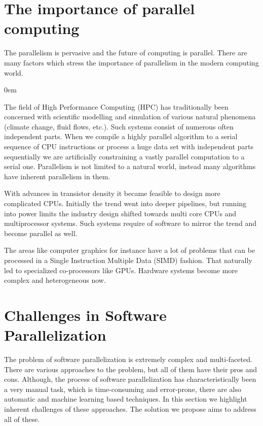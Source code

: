 \section{The importance of parallel computing}
\label{background_importance}
\quad The parallelism is pervasive and the future of computing is parallel. There are many factors which stress the importance of parallelism in the modern computing world.
\begin{description}[style=unboxed,leftmargin=0cm]
\itemsep0em
\item[Abundance of natural parallelism] The field of High Performance Computing (HPC) has traditionally been concerned with scientific modelling and simulation of various natural phenomena (climate change, fluid flows, etc.). Such systems consist of numerous often independent parts. When we compile a highly parallel algorithm to a serial sequence of CPU instructions or process a huge data set with independent parts sequentially we are artificially constraining a vastly parallel computation to a serial one. Parallelism is not limited to a natural world, instead many algorithms have inherent parallelism in them.
\item[Semiconductor technology advances and power limits] With advances in transistor density it became feasible to design more complicated CPUs. Initially the trend went into deeper pipelines, but running into power limits the industry design shifted towards multi core CPUs and multiprocessor systems. Such systems require of software to mirror the trend and become parallel as well.
\item[Domain inherent parallelism and specialized computations] The areas like computer graphics for instance have a lot of problems that can be processed in a Single Instruction Multiple Data (SIMD) fashion. That naturally led to specialized co-processors like GPUs. Hardware systems become more complex and heterogeneous now.
\end{description}

\section{Challenges in Software Parallelization}
\label{background_challenges}
\quad The problem of software parallelization is extremely complex and multi-faceted. There are various approaches to the problem, but all of them have their pros and cons. Although, the process of software parallelization has characteristically been a very manual task, which is time-consuming and error-prone, there are also automatic and machine learning based techniques. In this section we highlight inherent challenges of these approaches. The solution we propose aims to address all of these.
